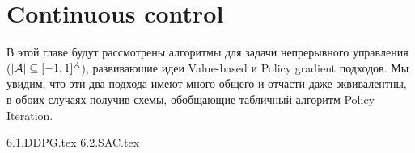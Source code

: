 \documentclass[../main.tex]{subfiles}
\begin{document}
\chapter{Continuous control}\label{continuouscontrolchapter}

В этой главе будут рассмотрены алгоритмы для задачи непрерывного управления ($|\mathcal{A}| \subseteq [-1, 1]^A$), развивающие идеи Value-based и Policy gradient подходов. Мы увидим, что эти два подхода имеют много общего и отчасти даже эквивалентны, в обоих случаях получив схемы, обобщающие табличный алгоритм Policy Iteration.

{6.1.DDPG.tex}
{6.2.SAC.tex}
\end{document}
